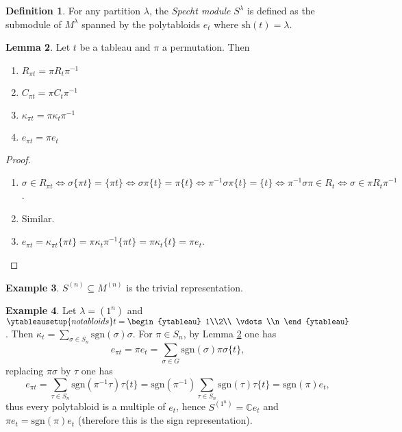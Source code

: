 \documentclass[a4paper]{article}
\newcommand{\sgn}{\text{sgn}}
\newcommand{\C}{\mathbb{C}}
\newcommand{\sh}{\text{sh}}
\theoremstyle{definition}
\newtheorem{defn}{Definition}[subsection]
\newtheorem{lemma}[defn]{Lemma}
\newtheorem{example}[defn]{Example}
\begin{document}
\begin{defn}
For any partition $\lambda$, the \textit{Specht module} $S^\lambda$ is defined as the submodule of $M^\lambda$ spanned by the polytabloids $e_t$ where $\sh(t)=\lambda$.
\end{defn}

\begin{lemma}
\label{lemma:tabpermformulae}
Let $t$ be a tableau and $\pi$ a permutation. Then
\begin{enumerate}
\item $R_{\pi t}=\pi R_t \pi^{-1}$
\item $C_{\pi t}=\pi C_t \pi^{-1}$
\item $\kappa_{\pi t}=\pi\kappa_t \pi^{-1}$
\item $e_{\pi t}=\pi e_t$
\end{enumerate}
\end{lemma}
\begin{proof}
\begin{enumerate}
\item $\sigma\in R_{\pi t}\iff\sigma\{\pi t\}=\{\pi t\}\iff\sigma\pi\{t\}=\pi\{t\}\iff\pi^{-1}\sigma\pi\{t\}=\{t\}\iff\pi^{-1}\sigma\pi\in R_t\iff \sigma\in\pi R_t\pi^{-1}$.
\item[2, 3.] Similar.
\item[4.] $e_{\pi t}=\kappa_{\pi t}\{\pi t\}=\pi\kappa_t\pi^{-1}\{\pi t\}=\pi\kappa_t\{t\}=\pi e_t$.
\end{enumerate}
\end{proof}

\begin{example}
$S^{(n)}\subseteq M^{(n)}$ is the trivial representation.
\end{example}

\begin{example}
\label{example:1colsignrep}
Let $\lambda=(1^n)$ and $\ytableausetup{notabloids} t=\begin{ytableau}
1\\2\\ \vdots\\n
\end{ytableau}$. Then $\kappa_t=\sum_{\sigma\in S_n}\sgn(\sigma)\sigma$. For $\pi\in S_n$, by Lemma \ref{lemma:tabpermformulae} one has
\[
e_{\pi t}=\pi e_t=\sum_{\sigma\in G}\sgn(\sigma)\pi\sigma\{t\},
\]
replacing $\pi\sigma$ by $\tau$ one has
\[
e_{\pi t}=\sum_{\tau\in S_n} \sgn(\pi^{-1}\tau)\tau\{t\}=\sgn(\pi^{-1})\sum_{\tau\in S_n}\sgn(\tau)\tau\{t\}=\sgn(\pi)e_t,
\]
thus every polytabloid is a multiple of $e_t$, hence $S^{(1^n)}=\C e_t$ and $\pi e_t=\sgn(\pi)e_t$ (therefore this is the sign representation).
\end{example}
\end{document}
